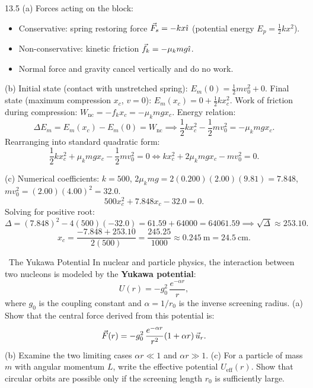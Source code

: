 \begin{tabletworkspace}[6.0cm]
\end{tabletworkspace}

\begin{solution}{13.5}
(a) Forces acting on the block:
\begin{itemize}[leftmargin=1.4em,itemsep=2pt]
  \item Conservative: spring restoring force $\vec{F}_s = -kx\hat{\imath}$ (potential energy $E_p = \frac{1}{2}kx^2$).
  \item Non-conservative: kinetic friction $\vec{f}_k = -\mu_k mg\hat{\imath}$.
  \item Normal force and gravity cancel vertically and do no work.
\end{itemize}

(b) Initial state (contact with unstretched spring): $E_m(0) = \frac{1}{2}m v_0^2 + 0$.
Final state (maximum compression $x_c$, $v = 0$): $E_m(x_c) = 0 + \frac{1}{2}k x_c^2$.
Work of friction during compression: $W_{\text{nc}} = -f_k x_c = -\mu_k mg x_c$.
Energy relation:
\[
\Delta E_m = E_m(x_c) - E_m(0) = W_{\text{nc}} \implies \frac{1}{2}k x_c^2 - \frac{1}{2}m v_0^2 = -\mu_k mg x_c.
\]
Rearranging into standard quadratic form:
\[
\frac{1}{2}k x_c^2 + \mu_k mg x_c - \frac{1}{2}m v_0^2 = 0 \iff k x_c^2 + 2\mu_k mg x_c - m v_0^2 = 0.
\]

(c) Numerical coefficients:
$k = 500$, $2\mu_k mg = 2(0.200)(2.00)(9.81) = 7.848$, $m v_0^2 = (2.00)(4.00)^2 = 32.0$.
\[
500 x_c^2 + 7.848 x_c - 32.0 = 0.
\]
Solving for positive root:
\[
\Delta = (7.848)^2 - 4(500)(-32.0) = 61.59 + 64000 = 64061.59 \implies \sqrt{\Delta} \approx 253.10.
\]
\[
x_c = \frac{-7.848 + 253.10}{2(500)} = \frac{245.25}{1000} \approx \mathbf{0.245\ \mathrm{m}} = 24.5\ \mathrm{cm}.
\]
\end{solution}

\begin{exercise}{\mastery\ The Yukawa Potential}
In nuclear and particle physics, the interaction between two nucleons is modeled by the \textbf{Yukawa potential}:
\[
U(r) = -g_0^2\,\frac{e^{-\alpha r}}{r},
\]
where $g_0$ is the coupling constant and $\alpha = 1/r_0$ is the inverse screening radius.
(a) Show that the central force derived from this potential is:
\[
\vec{F}(r) = -g_0^2\,\frac{e^{-\alpha r}}{r^2}(1 + \alpha r)\,\vec{u}_r.
\]
(b) Examine the two limiting cases $\alpha r \ll 1$ and $\alpha r \gg 1$.
(c) For a particle of mass $m$ with angular momentum $L$, write the effective potential $U_{\text{eff}}(r)$. Show that circular orbits are possible only if the screening length $r_0$ is sufficiently large.
\end{exercise}

